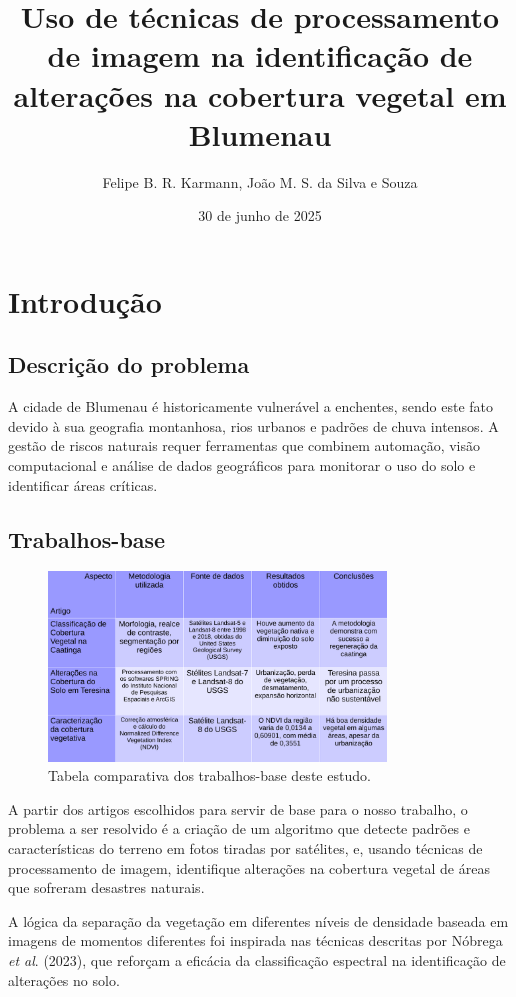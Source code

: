 \documentclass{article}
\author{Felipe B. R. Karmann, João M. S. da Silva e Souza}
\date{30 de junho de 2025}
\title{Uso de técnicas de processamento de imagem na identificação de alterações na cobertura vegetal em Blumenau}
\begin{document}
\maketitle

\section{Introdução}
\subsection{Descrição do problema}

A cidade de Blumenau é historicamente vulnerável a enchentes, sendo este fato devido à sua geografia montanhosa, rios urbanos e padrões de chuva intensos. A gestão de riscos naturais requer ferramentas que combinem automação, visão computacional e análise de dados geográficos para monitorar o uso do solo e identificar áreas críticas.

\subsection{Trabalhos-base}

\begin{figure}[H]
  \centering
  \includegraphics[width=0.8\textwidth]{../tabela.png}
  \caption{Tabela comparativa dos trabalhos-base deste estudo.}
  \label{Tabela comparativa}
\end{figure}

A partir dos artigos escolhidos para servir de base para o nosso trabalho, o problema a ser resolvido é a criação de um algoritmo que detecte padrões e características do terreno em fotos tiradas por satélites, e, usando técnicas de processamento de imagem, identifique alterações na cobertura vegetal de áreas que sofreram desastres naturais.

A lógica da separação da vegetação em diferentes níveis de densidade baseada em imagens de momentos diferentes foi inspirada nas técnicas descritas por Nóbrega \textit{et al}. (2023)\cite{artigo01}, que reforçam a eficácia da classificação espectral na identificação de alterações no solo.
\end{document}
